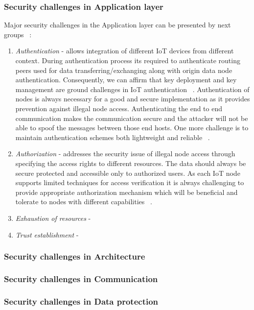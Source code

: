 \documentclass[12pt]{article}
\begin{document}
\subsubsection{Security challenges in Application layer}
Major security challenges in the Application layer can be presented by next groups ~\cite{IoTSur}:
\begin{enumerate}[label=(\roman*)]
	\item \textit{Authentication} - allows integration of different IoT devices from different context. During authentication process its required to authenticate routing peers used for data transferring/exchanging along with origin data node authentication. Consequently,  we can affirm that key deployment and key management are ground challenges in IoT authentication ~\cite{IoTCO}. Authentication of nodes is always necessary	for a good and secure implementation as it provides prevention against illegal node access. Authenticating the end to end communication makes the communication secure and the attacker will not be able to spoof the messages between those end hosts. One more challenge is to maintain authentication schemes both lightweight and reliable ~\cite{IoTICA}.   
	\item \textit{Authorization} - addresses the security issue of illegal node access through specifying the access rights to different resources. The data should always be secure protected and accessible only to authorized users. As each IoT node supports limited techniques for access verification it is always challenging to provide appropriate authorization mechanism which will be beneficial and tolerate to nodes with different capabilities ~\cite{IoTSecChel}.   
	\item \textit{Exhaustion of resources} -
	\item \textit{Trust establishment} -
\end{enumerate}

\subsubsection{Security challenges in Architecture}
\subsubsection{Security challenges in Communication}
\subsubsection{Security challenges in Data protection}
\end{document}
